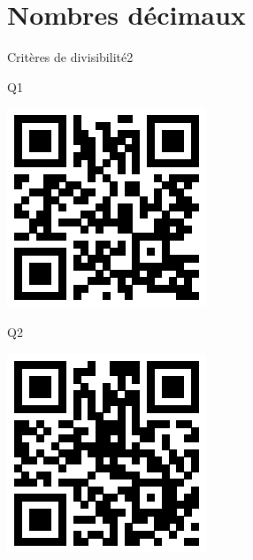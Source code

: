 \documentclass[a4paper,11pt]{report}
\begin{document}
\section*{Nombres décimaux}
\begin{qmoodle}{Critères de divisibilité}{2}{
	\begin{center}
		Q1

		\includegraphics[scale=1]{img/no1ne/necd/necd_1}
	\end{center}
	\begin{center}
		Q2

		\includegraphics[scale=1]{img/no1ne/necd/necd_2}
	\end{center}
}
\end{qmoodle}
\end{document}
